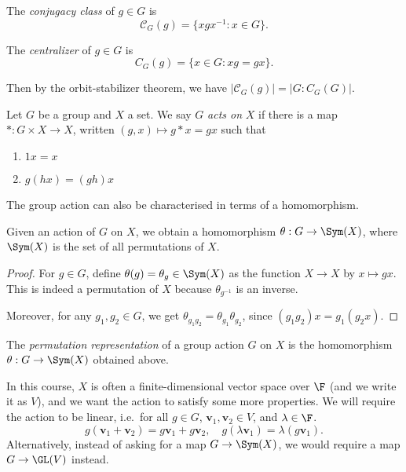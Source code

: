 \documentclass[a4paper]{article}
\begin{document}
\begin{defi}
  The \emph{conjugacy class} of $g \in G$ is
  \[
    \mathcal{C}_G(g)=\{xgx^{-1}: x \in G\}.
  \]
\end{defi}

\begin{defi}[Centralizer]
  The \emph{centralizer} of $g \in G$ is
  \[
    C_G(g) = \{x \in G: xg = gx\}.
  \]
\end{defi}
Then by the orbit-stabilizer theorem, we have $|\mathcal{C}_G(g)| = |G: C_G(G)|$.

\begin{defi}
  Let $G$ be a group and $X$ a set. We say $G$ \emph{acts on} $X$ if there is a map $*: G \times X \to X$, written $(g, x) \mapsto g * x = gx$ such that
  \begin{enumerate}
    \item $1x = x$
    \item $g(hx) = (gh)x$
  \end{enumerate}
\end{defi}

The group action can also be characterised in terms of a homomorphism.
\begin{lemma}
  Given an action of $G$ on $X$, we obtain a homomorphism $\theta: G \to \Sym(X)$, where $\Sym(X)$ is the set of all permutations of $X$.
\end{lemma}

\begin{proof}
  For $g \in G$, define $\theta(g) = \theta_g \in \Sym (X)$ as the function $X \to X$ by $x \mapsto gx$. This is indeed a permutation of $X$ because $\theta_{g^{-1}}$ is an inverse.

  Moreover, for any $g_1, g_2 \in G$, we get $\theta_{g_1g_2} = \theta_{g_1} \theta_{g_2}$, since $(g_1g_2) x = g_1(g_2x)$.
\end{proof}

\begin{defi}
  The \emph{permutation representation} of a group action $G$ on $X$ is the homomorphism $\theta: G \to \Sym (X)$ obtained above.
\end{defi}

In this course, $X$ is often a finite-dimensional vector space over $\F$ (and we write it as $V$), and we want the action to satisfy some more properties. We will require the action to be linear, i.e.\ for all $g \in G$, $\mathbf{v}_1, \mathbf{v}_2 \in V$, and $\lambda \in \F$.
\[
  g(\mathbf{v}_1 + \mathbf{v}_2) = g \mathbf{v}_1 + g \mathbf{v}_2,\quad g(\lambda \mathbf{v}_1) = \lambda (g\mathbf{v}_1).
\]
Alternatively, instead of asking for a map $G \to \Sym(X)$, we would require a map $G \to \GL(V)$ instead.
\end{document}
